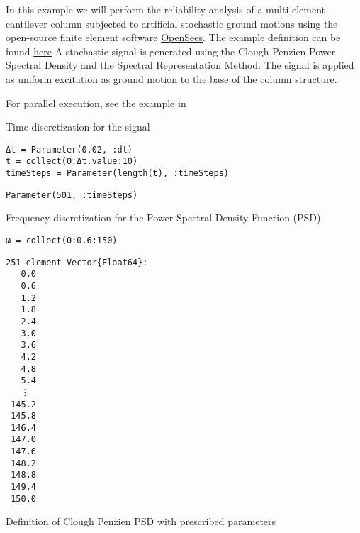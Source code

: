 \label{11825675392460849965}{}


In this example we will perform the reliability analysis of a multi element cantilever column subjected to artificial stochastic ground motions using the open-source finite element software \href{https://opensees.berkeley.edu/}{OpenSees}. The example definition can be found \href{https://opensees.berkeley.edu/wiki/index.php?title=Time\_History\_Analysis\_of\_a\_2D\_Elastic\_Cantilever\_Column}{here} A stochastic signal is generated using the Clough-Penzien Power Spectral Density and the Spectral Representation Method. The signal is applied as uniform excitation as {\textquotedbl}ground motion{\textquotedbl} to the base of the column structure.



For parallel execution, see the example in 





Time discretization for the signal




\begin{verbatim}
Δt = Parameter(0.02, :dt)
t = collect(0:Δt.value:10)
timeSteps = Parameter(length(t), :timeSteps)
\end{verbatim}


\begin{verbatim}
Parameter(501, :timeSteps)
\end{verbatim}



Frequency discretization for the Power Spectral Density Function (PSD)




\begin{verbatim}
ω = collect(0:0.6:150)
\end{verbatim}


\begin{verbatim}
251-element Vector{Float64}:
   0.0
   0.6
   1.2
   1.8
   2.4
   3.0
   3.6
   4.2
   4.8
   5.4
   ⋮
 145.2
 145.8
 146.4
 147.0
 147.6
 148.2
 148.8
 149.4
 150.0
\end{verbatim}



Definition of Clough Penzien PSD with prescribed parameters




